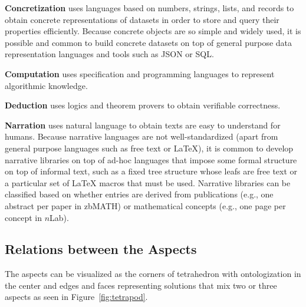 \textbf{Concretization} uses languages based on numbers, strings, lists, and records to obtain concrete representations of datasets in order to store and query their properties efficiently.
Because concrete objects are so simple and widely used, it is possible and common to build concrete datasets on top of general purpose data representation languages and tools such as JSON or SQL.

\textbf{Computation} uses specification and programming languages to represent algorithmic knowledge.

\textbf{Deduction} uses logics and theorem provers  to obtain verifiable correctness.

\textbf{Narration} uses natural language to obtain texts are easy to understand for humans.
Because narrative languages are not well-standardized (apart from general purpose languages such as free text or \LaTeX), it is common to develop narrative libraries on top of ad-hoc languages that impose some formal structure on top of informal text, such as a fixed tree structure whose leafs are free text or a particular set of {\LaTeX} macros that must be used.
Narrative libraries can be classified based on whether entries are derived from publications (e.g., one abstract per paper in zbMATH) or mathematical concepts (e.g., one page per concept in $n$Lab).



\subsection{Relations between the Aspects}

The aspects can be visualized as the corners of tetrahedron with ontologization in the center and edges and faces representing solutions that mix two or three aspects as seen in Figure~\ref{fig:tetrapod}.

\begin{center}
\end{center}


